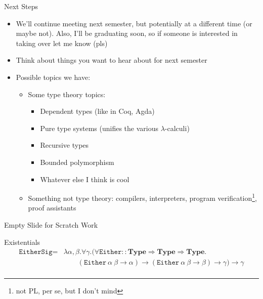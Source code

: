 \documentclass[leqno,presentation,usenames,dvipsnames]{beamer}
\newcommand{\Type}{\textbf{Type}}
\begin{document}
\begin{frame}[fragile]{Next Steps}
    \begin{itemize}
        \item We'll continue meeting next semester, but potentially at a different time (or maybe not).
            Also, I'll be graduating soon, so if someone is interested in taking over let me know (pls)
        \item Think about things you want to hear about for next semester
        \item Possible topics we have:
            \begin{itemize}
                \item Some type theory topics:
                    \begin{itemize}
                        \item Dependent types (like in Coq, Agda)
                        \item Pure type systems (unifies the various $\lambda$-calculi)
                        \item Recursive types
                        \item Bounded polymorphism
                        \item Whatever else I think is cool
                    \end{itemize}
                \item Something not type theory: compilers, interpreters, program verification\footnote{not PL, per se, but I don't mind}, proof assistants
            \end{itemize}
    \end{itemize}
\end{frame}

\begin{frame}{Empty Slide for Scratch Work}
\end{frame}

\begin{frame}{Existentials}
    \footnotesize
    \begin{align*}
        \texttt{EitherSig} = & \lambda \alpha,\beta. \forall \gamma. (\forall \texttt{Either} :: \Type \Rightarrow \Type \Rightarrow \Type. \\
                             & \qquad (\texttt{Either}~\alpha~\beta \to \alpha) \to (\texttt{Either}~\alpha~\beta \to \beta) \to \gamma) \to \gamma \\
    \end{align*}
\end{frame}
\end{document}
